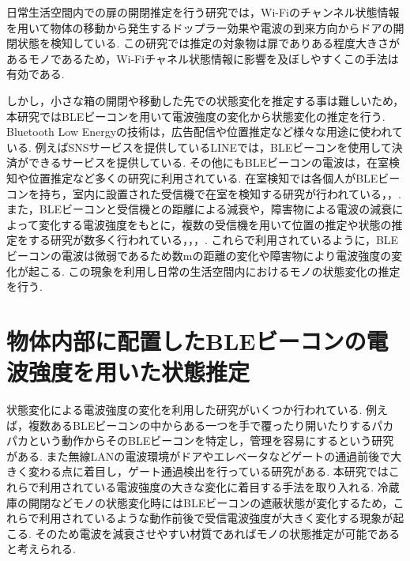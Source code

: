 \documentclass[Japanese]{dicomopapers}
\begin{document}
日常生活空間内での扉の開閉推定を行う研究\cite{WifiChannel}では，Wi-Fiのチャンネル状態情報を用いて物体の移動から発生するドップラー効果や電波の到来方向からドアの開閉状態を検知している.
この研究では推定の対象物は扉でありある程度大きさがあるモノであるため，Wi-Fiチャネル状態情報に影響を及ぼしやすくこの手法は有効である.

しかし，小さな箱の開閉や移動した先での状態変化を推定する事は難しいため，本研究ではBLEビーコンを用いて電波強度の変化から状態変化の推定を行う.
Bluetooth Low Energyの技術は，広告配信や位置推定など様々な用途に使われている.
例えばSNSサービスを提供しているLINEでは，BLEビーコンを使用して決済ができるサービスを提供している\cite{bleUse}.
その他にもBLEビーコンの電波は，在室検知や位置推定など多くの研究に利用されている.
在室検知では各個人がBLEビーコンを持ち，室内に設置された受信機で在室を検知する研究が行われている\cite{en-AreaUsed}，\cite{Finding_by_Counting}，\cite{dakoku_system}.
また，BLEビーコンと受信機との距離による減衰や，障害物による電波の減衰によって変化する電波強度をもとに，複数の受信機を用いて位置の推定や状態の推定をする研究が数多く行われている\cite{IoMT}，\cite{tandem}，\cite{blespot}，\cite{en-door}.%
これらで利用されているように，BLEビーコンの電波は微弱であるため数mの距離の変化や障害物により電波強度の変化が起こる.
この現象を利用し日常の生活空間内におけるモノの状態変化の推定を行う.










\section{物体内部に配置したBLEビーコンの電波強度を用いた状態推定}
状態変化による電波強度の変化を利用した研究がいくつか行われている.
例えば，複数あるBLEビーコンの中からある一つを手で覆ったり開いたりするパカパカという動作からそのBLEビーコンを特定し，管理を容易にするという研究がある\cite{BLEpkpk}.
また無線LANの電波環境がドアやエレベータなどゲートの通過前後で大きく変わる点に着目し，ゲート通過検出を行っている研究がある\cite{LANgate}.
本研究ではこれらで利用されている電波強度の大きな変化に着目する手法を取り入れる.
冷蔵庫の開閉などモノの状態変化時にはBLEビーコンの遮蔽状態が変化するため，これらで利用されているような動作前後で受信電波強度が大きく変化する現象が起こる.
そのため電波を減衰させやすい材質であればモノの状態推定が可能であると考えられる.
\end{document}
